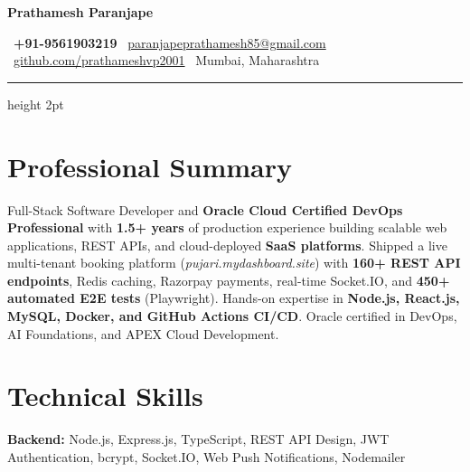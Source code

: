 \documentclass[a4paper,11pt]{article}
\begin{document}

\begin{center}
  {\fontsize{26}{28}\selectfont\bfseries\color{darkgray} Prathamesh Paranjape}

  \vspace{5pt}
  \footnotesize\color{medgray}
  \faPhone\ \textbf{+91-9561903219}
  \enspace\textbullet\enspace
  \faEnvelope\ \href{mailto:paranjapeprathamesh85@gmail.com}{paranjapeprathamesh85@gmail.com}
  \enspace\textbullet\enspace
  \faGithub\ \href{https://github.com/prathameshvp2001}{github.com/prathameshvp2001}
  \enspace\textbullet\enspace
  \faMapMarker\ Mumbai, Maharashtra

  \vspace{3pt}
  \color{primary}\hrule height 2pt
\end{center}

\vspace{-2pt}

\section{Professional Summary}
\vspace{2pt}
\small\color{darkgray}
Full-Stack Software Developer and \textbf{Oracle Cloud Certified DevOps Professional} with \textbf{1.5+ years} of production experience building scalable web applications, REST APIs, and cloud-deployed \textbf{SaaS platforms}. Shipped a live multi-tenant booking platform (\textit{pujari.mydashboard.site}) with \textbf{160+ REST API endpoints}, Redis caching, Razorpay payments, real-time Socket.IO, and \textbf{450+ automated E2E tests} (Playwright). Hands-on expertise in \textbf{Node.js, React.js, MySQL, Docker, and GitHub Actions CI/CD}. Oracle certified in DevOps, AI Foundations, and APEX Cloud Development.

\vspace{2pt}

\section{Technical Skills}
\vspace{5pt}
\small\color{darkgray}\setlength{\parskip}{5pt}

\noindent\textbf{\color{primary}Backend:} Node.js, Express.js, TypeScript, REST API Design, JWT Authentication, bcrypt, Socket.IO, Web Push Notifications, Nodemailer
\end{document}
